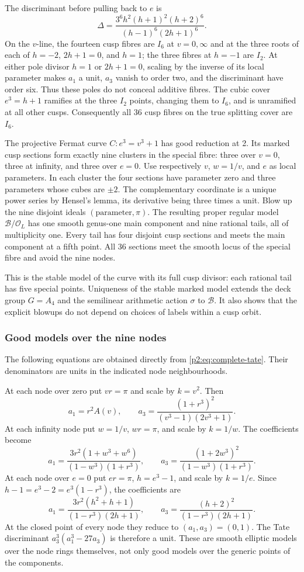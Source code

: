 The discriminant before pulling back to $e$ is
\[
\Delta=\frac{3^6h^2(h+1)^2(h+2)^6}{(h-1)^6(2h+1)^6}.
\]
On the $v$-line, the fourteen cusp fibres are $I_6$ at $v=0,\infty$ and
at the three roots of each of $h=-2$, $2h+1=0$, and $h=1$; the three
fibres at $h=-1$ are $I_2$. At either pole divisor $h=1$ or $2h+1=0$,
scaling by the inverse of its local parameter makes $a_1$ a unit,
$a_3$ vanish to order two, and the discriminant have order six.
Thus these poles do not conceal additive fibres.
The cubic cover $e^3=h+1$ ramifies at the three $I_2$ points, changing
them to $I_6$, and is unramified at all other cusps. Consequently all
36 cusp fibres on the true splitting cover are $I_6$.

The projective Fermat curve $C:e^3=v^3+1$ has good reduction at 2.
Its marked cusp sections form exactly nine clusters in the special fibre:
three over $v=0$, three at infinity, and three over $e=0$.
Use respectively $v$, $w=1/v$, and $e$ as local parameters. In each
cluster the four sections have parameter zero and three parameters whose
cubes are $\pm2$. The complementary coordinate is a unique power series
by Hensel's lemma, its derivative being three times a unit.
Blow up the nine disjoint ideals $(\text{parameter},\pi)$.
The resulting proper regular model $\mathcal B/\mathcal O_L$ has one
smooth genus-one main component and nine rational tails, all of
multiplicity one. Every tail has four disjoint cusp sections and meets
the main component at a fifth point. All 36 sections meet the smooth
locus of the special fibre and avoid the nine nodes.

This is the stable model of the curve with its full cusp divisor: each
rational tail has five special points. Uniqueness of the stable marked
model extends the deck group $G=A_4$ and the semilinear arithmetic action
$\sigma$ to $\mathcal B$. It also shows that the explicit blowups do not
depend on choices of labels within a cusp orbit.

\subsubsection{Good models over the nine nodes}
The following equations are obtained directly from
\eqref{p2:eq:complete-tate}. Their denominators are units in the indicated
node neighbourhoods.

At each node over zero put $vr=\pi$ and scale by $k=v^2$. Then
\[
a_1=r^2A(v),\qquad
a_3=\frac{(1+r^3)^2}{(v^3-1)(2v^3+1)}.
\]
At each infinity node put $w=1/v$, $wr=\pi$, and scale by $k=1/w$.
The coefficients become
\[
a_1=\frac{3r^2(1+w^3+w^6)}{(1-w^3)(1+r^3)},\qquad
a_3=\frac{(1+2w^3)^2}{(1-w^3)(1+r^3)}.
\]
At each node over $e=0$ put $er=\pi$, $h=e^3-1$, and scale by $k=1/e$.
Since $h-1=e^3-2=e^3(1-r^3)$, the coefficients are
\[
a_1=\frac{3r^2(h^2+h+1)}{(1-r^3)(2h+1)},\qquad
a_3=\frac{(h+2)^2}{(1-r^3)(2h+1)}.
\]
At the closed point of every node they reduce to $(a_1,a_3)=(0,1)$.
The Tate discriminant $a_3^3(a_1^3-27a_3)$ is therefore a unit.
These are smooth elliptic models over the node rings themselves, not
only good models over the generic points of the components.

